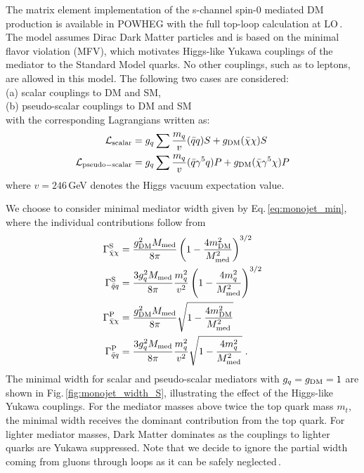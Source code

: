 The matrix element implementation of the s-channel spin-0 mediated DM production is available in POWHEG with the full top-loop calculation at LO\,\cite{Haisch:2015ioa}.
The model assumes Dirac Dark Matter particles and is based on the minimal flavor violation (MFV), which motivates Higgs-like Yukawa couplings of the mediator to the Standard Model quarks. No other couplings, such as to leptons, are allowed in this model.
The following two cases are considered:\\
(a) scalar couplings to DM and SM,\\
(b) pseudo-scalar couplings to DM and SM\\
\noindent with the corresponding Lagrangians written as:
\begin{align}
\label{eq:SP} 
\mathcal{L}_{\mathrm{scalar}} &= g_q \sum \frac{m_q}{v} (\bar{q}q) S + \gDM (\bar{\chi}\chi) S \\
\mathcal{L}_{\mathrm{pseudo-scalar}} &= g_q \sum \frac{m_q}{v} (\bar{q}\gamma^5q) P + \gDM (\bar{\chi}\gamma^5\chi) P \\
\end{align}
where $v=246$\,GeV denotes the Higgs vacuum expectation value.

We choose to consider minimal mediator width given by Eq.\,\ref{eq:monojet_min}, where the individual contributions follow from
\begin{align}
\Gamma_{\bar{\chi}\chi}^{\rm{S}}&=\frac{\gDM^2 \mMed}{8\pi}\left(1-\frac{4 \mDM^2}{\mMed^2} \right)^{3/2}\\
\Gamma_{\bar{q}q}^{\rm{S}}&= \frac{3 \gq^2 \mMed}{8\pi}\frac{m_q^2}{v^2}\left(1-\frac{4 m_q^2}{\mMed^2}\right)^{3/2}\\
\Gamma_{\bar{\chi}\chi}^{\rm{P}}&=\frac{\gDM^2 \mMed}{8\pi} \sqrt{1-\frac{4 \mDM^2}{\mMed^2}}\\
\Gamma_{\bar{q}q}^{\rm{P}}&= \frac{3 \gq^2 \mMed}{8\pi}\frac{m_q^2}{v^2}\sqrt{1-\frac{4 m_q^2}{\mMed^2}}\label{eq:Gamma4}\;.
\end{align}
The minimal width for scalar and pseudo-scalar mediators with $g_q=g_{\rm{DM}}=1$ are shown in Fig.\,\ref{fig:monojet_width_S}, illustrating the effect of the Higgs-like Yukawa couplings. For the mediator masses above twice the top quark mass $m_t$, the minimal width receives the dominant contribution from the top quark. For lighter mediator masses, Dark Matter dominates as the couplings to lighter quarks are Yukawa suppressed.
Note that we decide to ignore the partial width coming from gluons through loops as it can be safely neglected\,\cite{Haisch:2015ioa}.


